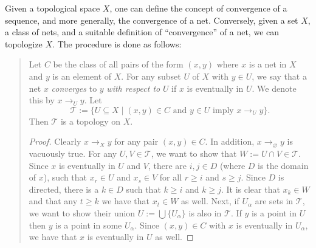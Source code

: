 \documentclass[12pt]{article}
\begin{document}
Given a topological space $X$, one can define the concept of convergence of a sequence, and more generally, the convergence of a net.  Conversely, given a set $X$, a class of nets, and a suitable definition of ``convergence'' of a net, we can topologize $X$.  The procedure is done as follows: 
\begin{quote}
Let $C$ be the class of all pairs of the form $(x,y)$ where $x$ is a net in $X$ and $y$ is an element of $X$.  For any subset $U$ of $X$ with $y\in U$, we say that a net $x$ \emph{converges} to $y$ \emph{with respect to} $U$ if $x$ is eventually in $U$.  We denote this by $x\to_U y$.  Let $$\mathcal{T}:=\lbrace U\subseteq X\mid (x,y)\in C\mbox{ and }y\in U\mbox{ imply }x\to_U y\rbrace.$$
Then $\mathcal{T}$ is a topology on $X$.
\begin{proof}
Clearly $x\to_X y$ for any pair $(x,y)\in C$.  In addition, $x\to_{\varnothing} y$ is vacuously true.  For any $U,V\in \mathcal{T}$, we want to show that $W:=U\cap V\in \mathcal{T}$.  Since $x$ is eventually in $U$ and $V$, there are $i,j\in D$ (where $D$ is the domain of $x$), such that $x_r\in U$ and $x_s\in V$ for all $r\ge i$ and $s\ge j$.  Since $D$ is directed, there is a $k\in D$ such that $k\ge i$ and $k\ge j$.  It is clear that $x_k\in W$ and that any $t\ge k$ we have that $x_t\in W$ as well.  Next, if $U_{\alpha}$ are sets in $\mathcal{T}$, we want to show their union $U:=\bigcup \lbrace U_{\alpha}\rbrace$ is also in $\mathcal{T}$.  If $y$ is a point in $U$ then $y$ is a point in some $U_{\alpha}$.  Since $(x,y)\in C$ with $x$ is eventually in $U_{\alpha}$, we have that $x$ is eventually in $U$ as well.
\end{proof}
\end{quote}
\end{document}
